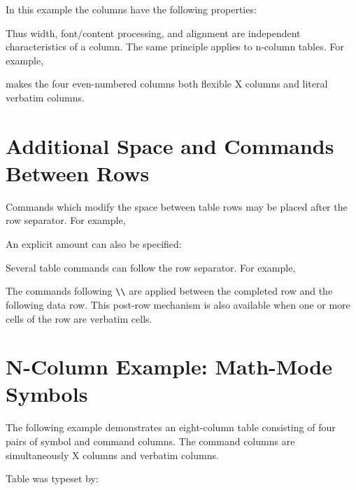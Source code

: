\documentclass[
11pt,
a4paper,
oneside
]{scrbook}
\begin{document}



In this example the columns have the following properties:
\begin{center}
\end{center}
Thus width, font/content processing, and alignment are independent
characteristics of a column.
The same principle applies to n-column tables. For example,




makes the four even-numbered columns both flexible X columns and literal
verbatim columns.

\section{Additional Space and Commands Between Rows}

Commands which modify the space between table rows may be placed after the
row separator.
For example,




An explicit amount can also be specified:




Several table commands can follow the row separator. For example,




The commands following \texttt{\textbackslash{}\textbackslash{}} are applied between the completed
row and the following data row.
This post-row mechanism is also available when one or more cells of the row
are verbatim cells.

\section{N-Column Example: Math-Mode Symbols}

The following example demonstrates an eight-column table consisting of four
pairs of symbol and command columns. The command columns are simultaneously
X columns and verbatim columns.

\noindent Table  was typeset by:
\end{document}
